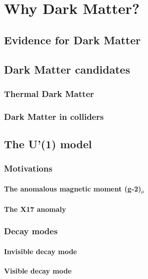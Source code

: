 
\chapter{Why Dark Matter?} %

\label{chapter6}


\section{Evidence for Dark Matter}
\label{chapter1:sec:dm-evidence}

\section{Dark Matter candidates}
\label{chapter1:sec:dm-candidates}

\subsection{Thermal Dark Matter}
\label{chapter1:sec:dm-thermal}

\subsection{Dark Matter in colliders}
\label{chapter1:sec:dm-colliders}

\section{The U'(1) model}
\label{chapter1:sec:dm-u1model}

\subsection{Motivations}
\label{chapter1:sec:dm-u1model-motivations}

\subsubsection{The anomalous magnetic moment (g-2)$_{\mu}$}
\label{chapter1:sec:dm-u1model-motivations-g2}

\subsubsection{The X17 anomaly}
\label{chapter1:sec:dm-u1model-motivations-x17}

\subsection{Decay modes}
\label{chapter1:sec:dm-decay}

\subsubsection{Invisible decay mode}
\label{chapter1:sec:dm-decay-invis}

\subsubsection{Visible decay mode}
\label{chapter1:sec:dm-decay-vis}

